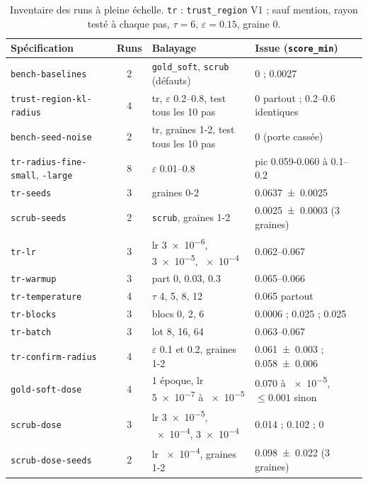 \documentclass[11pt,a4paper]{article}
\newcommand{\code}[1]{\texttt{#1}}
\begin{document}
\begin{table}[ht]
  \centering\small
  \caption{Inventaire des runs à pleine échelle. \code{tr} : \code{trust\_region} V1 ; sauf mention,
  rayon testé à chaque pas, $\tau=6$, $\varepsilon=\num{0.15}$, graine 0.}\label{tab:inventaire}
  \begin{tabularx}{\linewidth}{@{}>{\raggedright}p{3.5cm}c>{\raggedright}p{4.1cm}X@{}}
    \toprule
    Spécification & Runs & Balayage & Issue (\code{score\_min})\\
    \midrule
    \code{bench-baselines} & 2 & \code{gold\_soft}, \code{scrub} (défauts) & 0 ; \num{0.0027}\\
    \code{trust-region-kl-radius} & 4 & tr, $\varepsilon$ \numrange{0.2}{0.8}, test tous les 10 pas & 0 partout ;
      \numrange{0.2}{0.6} identiques\\
    \code{bench-seed-noise} & 2 & tr, graines 1-2, test tous les 10 pas & 0 (porte cassée)\\
    \code{tr-radius-fine-small}, \code{-large} & 8 & $\varepsilon$ \numrange{0.01}{0.8} & pic \num{0.059}-\num{0.060}
      à \numrange{0.1}{0.2}\\
    \code{tr-seeds} & 3 & graines 0-2 & \num{0.0637 +- 0.0025}\\
    \code{scrub-seeds} & 2 & \code{scrub}, graines 1-2 & \num{0.0025 +- 0.0003} (3 graines)\\
    \code{tr-lr} & 3 & lr \num{3e-6}, \num{3e-5}, \num{e-4} & \numrange{0.062}{0.067}\\
    \code{tr-warmup} & 3 & part 0, \num{0.03}, \num{0.3} & \numrange{0.065}{0.066}\\
    \code{tr-temperature} & 4 & $\tau$ 4, 5, 8, 12 & \num{0.065} partout\\
    \code{tr-blocks} & 3 & blocs 0, 2, 6 & \num{0.0006} ; \num{0.025} ; \num{0.025}\\
    \code{tr-batch} & 3 & lot 8, 16, 64 & \numrange{0.063}{0.067}\\
    \code{tr-confirm-radius} & 4 & $\varepsilon$ \num{0.1} et \num{0.2}, graines 1-2 & \num{0.061 +- 0.003} ; \num{0.058 +- 0.006}\\
    \code{gold-soft-dose} & 4 & 1 époque, lr \num{5e-7} à \num{e-5} & \num{0.070} à \num{e-5}, $\le\num{0.001}$ sinon\\
    \code{scrub-dose} & 3 & lr \num{3e-5}, \num{e-4}, \num{3e-4} & \num{0.014} ; \num{0.102} ; 0\\
    \code{scrub-dose-seeds} & 2 & lr \num{e-4}, graines 1-2 & \num{0.098 +- 0.022} (3 graines)\\

\end{tabularx}
\end{table}
\end{document}
